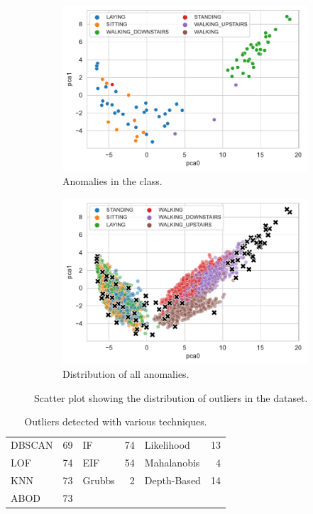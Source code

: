 \documentclass[10pt, a4paper, twocolumn]{article}
\begin{document}
\begin{figure}
  \begin{subfigure}[t]{0.49\columnwidth}
    \includegraphics[width=\linewidth]{immagini Lia/all_classes_anomalies.pdf}
    \caption{Anomalies in the class.}
    \label{fig:ana}
  \end{subfigure}
  \hfill%
  \begin{subfigure}[t]{0.49\columnwidth}
    \includegraphics[width=\linewidth]{immagini Lia/anamoalies_of_the_class.pdf}
    \caption{Distribution of all anomalies.}
    \label{fig:allclassesana}
  \end{subfigure}
\caption{Scatter plot showing the distribution of outliers in the dataset.}
\label{fig:majority}
\end{figure}

\begin{table}[h]
    \centering
    \caption{Outliers detected with various techniques.}
    \begin{tabular}{lr|lr|lr}
        \toprule
        DBSCAN & 69 & IF & 74 & Likelihood & 13 \\
        LOF & 74 & EIF & 54  & Mahalanobis & 4 \\
        KNN & 73 & Grubbs & 2 & Depth-Based & 14 \\
        ABOD & 73 &  &  &  & \\
        \bottomrule
    \end{tabular}
    \label{tab:outliers}
\end{table}
\end{document}
